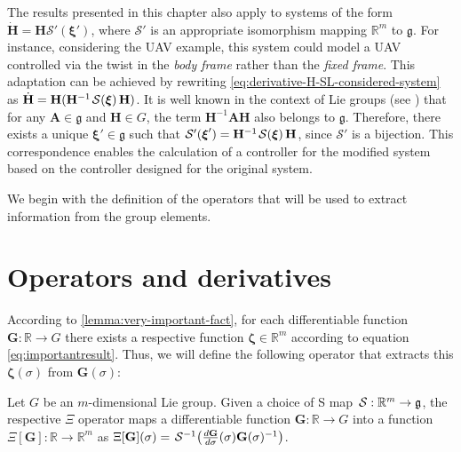 \begin{remark}
    The results presented in this chapter also apply to systems of the form $\dot{\mathbf{H}} = \mathbf{H} \mathcal{S}'(\boldsymbol{\xi}')$, where $\mathcal{S}'$ is an appropriate isomorphism mapping $\mathbb{R}^m$ to $\mathfrak{g}$. For instance, considering the UAV example, this system could model a UAV controlled via the twist in the \emph{body frame} rather than the \emph{fixed frame}. This adaptation can be achieved by rewriting \eqref{eq:derivative-H-SL-considered-system} as $\dot{\mathbf{H}} = \mathbf{H}(\mathbf{H}^{-1} \SL[\boldsymbol{\xi}] \mathbf{H})$. It is well known in the context of Lie groups (see \citet[p. 86]{Gallier2020}) that for any $\mathbf{A} \in \mathfrak{g}$ and $\mathbf{H} \in G$, the term $\mathbf{H}^{-1} \mathbf{A} \mathbf{H}$ also belongs to $\mathfrak{g}$. Therefore, there exists a unique $\boldsymbol{\xi}' \in \mathfrak{g}$ such that $\mathcal{S}'(\boldsymbol{\xi}') = \mathbf{H}^{-1} \SL[\boldsymbol{\xi}] \mathbf{H}$, since $\mathcal{S}'$ is a bijection. This correspondence enables the calculation of a controller for the modified system based on the controller designed for the original system.
\end{remark}

We begin with the definition of the operators that will be used to extract information from the group elements.
\section{Operators and derivatives}
According to \cref{lemma:very-important-fact}, for each differentiable function $\mathbf{G}: \mathbb{R} \to G$ there exists a respective function $\boldsymbol{\zeta} \in \mathbb{R}^m$ according to equation \eqref{eq:importantresult}. Thus, we will define the following operator that extracts this $\boldsymbol{\zeta}(\sigma)$ from $\mathbf{G}(\sigma)$:
\begin{definition} [$\Xi$ operator] \label{def:Xioperator} Let $G$ be an $m$-dimensional Lie group. Given a choice of S map $\SL: \mathbb{R}^m \to \mathfrak{g}$, the respective $\Xi$ operator maps a differentiable function $\mathbf{G}: \mathbb{R} \to G$ into a function $\Xi[\mathbf{G}]: \mathbb{R} \to \mathbb{R}^m$ as $\Xi[\mathbf{G}](\sigma) = \SL^{-1}\bigl(\frac{d\mathbf{G}}{d\sigma}(\sigma)\mathbf{G}(\sigma)^{-1}\bigr)$. 
\end{definition}


